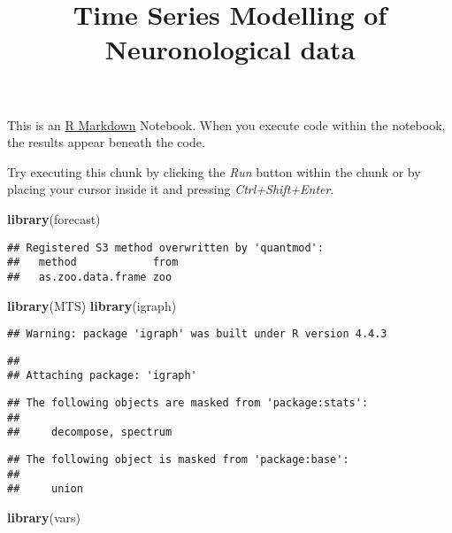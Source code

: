 \documentclass[
]{article}
\title{Time Series Modelling of Neuronological data}
\author{}
\date{\vspace{-2.5em}}
\newenvironment{Shaded}{\begin{snugshade}}{\end{snugshade}}
\newcommand{\FunctionTok}[1]{\textcolor[rgb]{0.13,0.29,0.53}{\textbf{#1}}}
\newcommand{\NormalTok}[1]{#1}
\begin{document}
\maketitle

This is an \href{http://rmarkdown.rstudio.com}{R Markdown} Notebook.
When you execute code within the notebook, the results appear beneath
the code.

Try executing this chunk by clicking the \emph{Run} button within the
chunk or by placing your cursor inside it and pressing
\emph{Ctrl+Shift+Enter}.

\begin{Shaded}
\begin{Highlighting}[]
\FunctionTok{library}\NormalTok{(forecast)}
\end{Highlighting}
\end{Shaded}

\begin{verbatim}
## Registered S3 method overwritten by 'quantmod':
##   method            from
##   as.zoo.data.frame zoo
\end{verbatim}

\begin{Shaded}
\begin{Highlighting}[]
\FunctionTok{library}\NormalTok{(MTS)}
\FunctionTok{library}\NormalTok{(igraph)}
\end{Highlighting}
\end{Shaded}

\begin{verbatim}
## Warning: package 'igraph' was built under R version 4.4.3
\end{verbatim}

\begin{verbatim}
## 
## Attaching package: 'igraph'
\end{verbatim}

\begin{verbatim}
## The following objects are masked from 'package:stats':
## 
##     decompose, spectrum
\end{verbatim}

\begin{verbatim}
## The following object is masked from 'package:base':
## 
##     union
\end{verbatim}

\begin{Shaded}
\begin{Highlighting}[]
\FunctionTok{library}\NormalTok{(vars)}
\end{Highlighting}
\end{Shaded}
\end{document}
